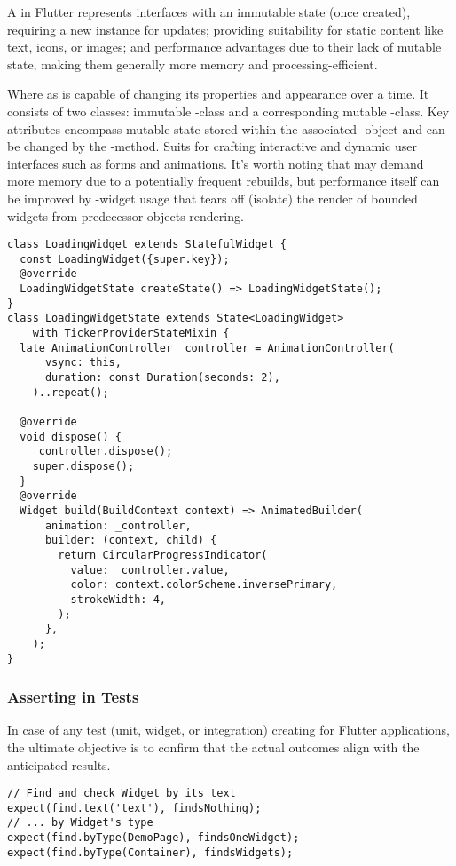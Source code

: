 A  in Flutter represents interfaces with an immutable state (once created), requiring a new instance 
for updates; providing suitability for static content like text, icons, or images; and performance advantages due to 
their lack of mutable state, making them generally more memory and processing-efficient.

Where as  is capable of changing its properties and appearance over a time. It consists of two classes: 
immutable -class and a corresponding mutable -class. Key attributes encompass mutable state stored 
within the associated -object and can be changed by the -method. Suits for crafting interactive 
and dynamic user interfaces such as forms and animations. It's worth noting that  may demand more 
memory due to a potentially frequent rebuilds, but performance itself can be improved by -widget 
usage that tears off (isolate) the render of bounded widgets from predecessor objects rendering.

\begin{lstlisting}
class LoadingWidget extends StatefulWidget {
  const LoadingWidget({super.key});
  @override
  LoadingWidgetState createState() => LoadingWidgetState();
}
class LoadingWidgetState extends State<LoadingWidget> 
    with TickerProviderStateMixin {
  late AnimationController _controller = AnimationController(
      vsync: this,
      duration: const Duration(seconds: 2),
    )..repeat();

  @override
  void dispose() {
    _controller.dispose();
    super.dispose();
  }
  @override
  Widget build(BuildContext context) => AnimatedBuilder(
      animation: _controller,
      builder: (context, child) {
        return CircularProgressIndicator(
          value: _controller.value,
          color: context.colorScheme.inversePrimary,
          strokeWidth: 4,
        );
      },
    );
}
\end{lstlisting}


\newpage
\subsubsection{Asserting in Tests}

In case of any test (unit, widget, or integration) creating for Flutter applications, the ultimate objective is to 
confirm that the actual outcomes align with the anticipated results.

\begin{lstlisting}
// Find and check Widget by its text
expect(find.text('text'), findsNothing);
// ... by Widget's type
expect(find.byType(DemoPage), findsOneWidget);
expect(find.byType(Container), findsWidgets);
\end{lstlisting}

